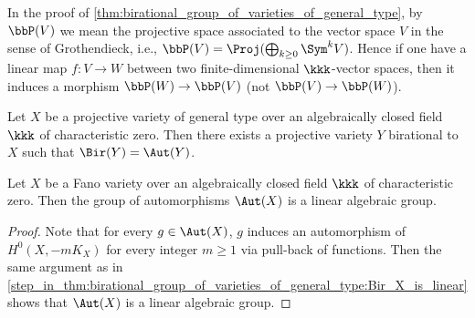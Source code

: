     \begin{remark}\label{rmk_on_finite_birational_group_of_general_type:projection_in_the_sense_of_Grothendieck_and_its_dual}
        In the proof of \cref{thm:birational_group_of_varieties_of_general_type}, by \(\bbP(V)\) we mean the projective space associated to the vector space \(V\) in the sense of Grothendieck, i.e., \(\bbP(V) = \Proj(\bigoplus_{k \geq 0} \Sym^k V)\).
        Hence if one have a linear map \(f: V \to W\) between two finite-dimensional \(\kkk\)-vector spaces, then it induces a morphism \(\bbP(W) \to \bbP(V)\) (not \(\bbP(V) \to \bbP(W)\)).
    \end{remark}

    \begin{corollary}\label{cor:regularization_of_birational_group_of_varieties_of_general_type}
        Let \(X\) be a projective variety of general type over an algebraically closed field \(\kkk\) of characteristic zero. 
        Then there exists a projective variety \(Y\) birational to \(X\) such that \(\Bir(Y) = \Aut(Y)\).
    \end{corollary}

    \begin{corollary}\label{cor:automorphism_group_of_Fano_varieties_is_linear}
        Let \(X\) be a Fano variety over an algebraically closed field \(\kkk\) of characteristic zero. 
        Then the group of automorphisms \(\Aut(X)\) is a linear algebraic group.
    \end{corollary}
    \begin{proof}
        Note that for every \(g \in \Aut(X)\), \(g\) induces an automorphism of \(H^0(X, -mK_X)\) for every integer \(m \geq 1\) via pull-back of functions.
        Then the same argument as in \cref{step_in_thm:birational_group_of_varieties_of_general_type:Bir_X_is_linear} shows that \(\Aut(X)\) is a linear algebraic group.
    \end{proof}

    
